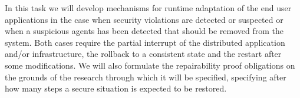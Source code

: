 \begin{Workpackage}{\thewpno}
\begin{Task}
\end{Task}



%
%
%


\begin{Task}
\TaskResults{%
\ref{del:vul1},
\ref{del:vul2},
\ref{del:vul3}
}
\TaskHeader{}
In this task we will develop mechanisms for runtime adaptation of the end user applications in the case when security violations are detected or suspected or when a suspicious agents has been detected that should be removed from the system. Both cases require the partial interrupt of the distributed application and/or infrastructure, the rollback to a consistent state and the restart after some modifications. We will also formulate the repairability proof obligations on the grounds of the research through which it will be specified, specifying after how many steps a secure situation is expected to be restored. \taskbreak


\end{Task}
\end{Workpackage}
